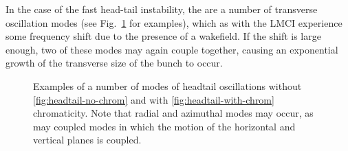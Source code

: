 In the case of the fast head-tail instability, the are a number of transverse oscillation modes (see Fig.~\ref{fig:trans_oscillations} for examples), which as with the LMCI experience some frequency shift due to the presence of a wakefield. If the shift is large enough, two of these modes may again couple together, causing an exponential growth of the transverse size of the bunch to occur.

\begin{figure}
\begin{center}
\end{center}
\caption{Examples of a number of modes of headtail oscillations without \ref{fig:headtail-no-chrom} and with \ref{fig:headtail-with-chrom} chromaticity. Note that radial and azimuthal modes may occur, as may coupled modes in which the motion of the horizontal and vertical planes is coupled.}
\label{fig:trans_oscillations}
\end{figure}


